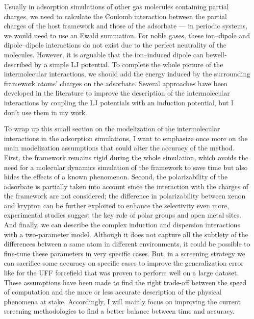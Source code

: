 \documentclass[main.tex]{subfiles}
\begin{document}
Usually in adsorption simulations of other gas molecules containing partial charges, we need to calculate the Coulomb interaction between the partial charges of the host framework and those of the adsorbate --- in periodic systems, we would need to use an Ewald summation. For noble gases, these ion--dipole and dipole--dipole interactions do not exist due to the perfect neutrality of the molecules. However, it is arguable that the ion--induced dipole  can bewell-described by a simple LJ potential. To complete the whole picture of the intermolecular interactions, we should add the energy induced by the surrounding framework atoms’ charges on the adsorbate. Several approaches have been developed in the literature to improve the description of the intermolecular interactions by coupling the LJ potentials with an induction potential,\autocite{Lachet_1998,Becker_2017} but I don't use them in my work.

To wrap up this small section on the modelization of the intermolecular interactions in the adsorption simulations, I want to emphasize once more on the main modelization assumptions that could alter the accuracy of the method. First, the framework remains rigid during the whole simulation, which avoids the need for a molecular dynamics simulation of the framework to save time but also hides the effects of a known phenomenon.\autocite{Witman_2017} Second, the polarizability of the adsorbate is partially taken into account since the interaction with the charges of the framework are not considered; the difference in polarizability between xenon and krypton can be further exploited to enhance the selectivity even more, experimental studies suggest the key role of polar groups and open metal sites.\autocite{Li_2019,Pei_2022,Perry_2014} And finally, we can describe the complex induction and dispersion interactions with a two-parameter model. Although it does not capture all the subtlety of the differences between a same atom in different environments, it could be possible to fine-tune these parameters in very specific cases. But, in a screening strategy we can sacrifice some accuracy on specific cases to improve the generalization error like for the UFF forcefield that was proven to perform well on a large dataset.\autocite{McDaniel_2015}
These assumptions have been made to find the right trade-off between the speed of computation and the more or less accurate description of the physical phenomena at stake. Accordingly, I will mainly focus on improving the current screening methodologies to find a better balance between time and accuracy. 
\end{document}

